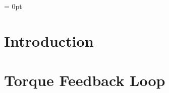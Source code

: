 \documentclass[12pt]{article}
\begin{document}


\parindent = 0pt

\tableofcontents

\newpage

\section{Introduction}


\newpage

\section{Torque Feedback Loop}


\newpage

%

%

%

%

%

%


%
\end{document}

